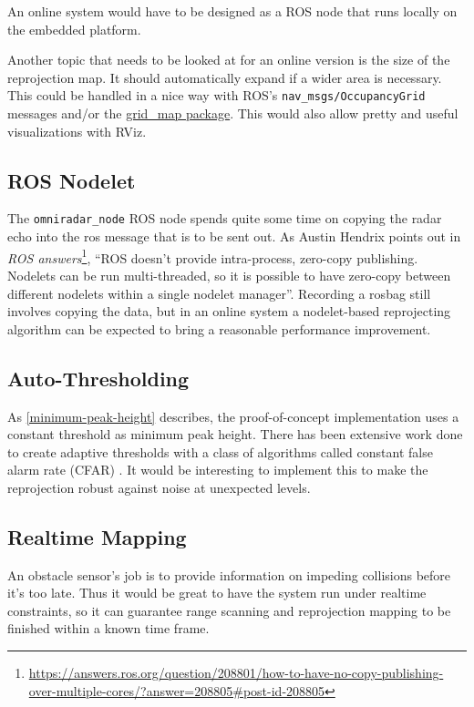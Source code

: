 An online system would have to be designed as a ROS node that
runs locally on the embedded platform.

Another topic that needs to be looked at for an online version is the
size of the reprojection map. It should automatically expand if a wider
area is necessary. This could be handled in a nice way with ROS's
\texttt{nav\_msgs/OccupancyGrid} messages and/or the
\href{http://wiki.ros.org/grid_map}{grid\_map package}. This would also
allow pretty and useful visualizations with RViz.


\subsection{ROS Nodelet}\label{ros-nodelet}
The \texttt{omniradar\_node} ROS node spends quite some time on copying
the radar echo into the ros message that is to be sent out. As Austin
Hendrix points out in \textit{ROS answers}\footnote{\url{https://answers.ros.org/question/208801/how-to-have-no-copy-publishing-over-multiple-cores/?answer=208805\#post-id-208805}}, ``ROS doesn't provide intra-process, zero-copy publishing.
Nodelets can be run multi-threaded, so it is possible to have zero-copy
between different nodelets within a single nodelet manager''. Recording
a rosbag still involves copying the data, but in an online system a
nodelet-based reprojecting algorithm can be expected to bring a
reasonable performance improvement.


\subsection{Auto-Thresholding}\label{auto-thresholding}
As \cref{minimum-peak-height} describes, the proof-of-concept implementation uses a constant threshold as minimum peak height. There has been extensive work done to create adaptive thresholds with a class of algorithms called constant false alarm rate (CFAR) \cite{Skolnik2008,Adams2012}. It would be interesting to implement this to make the reprojection robust against noise at unexpected levels.


\subsection{Realtime Mapping}\label{realtime}
An obstacle sensor's job is to provide information on impeding
collisions before it's too late. Thus it would be great to have the
system run under realtime constraints, so it can guarantee range
scanning and reprojection mapping to be finished within a known time
frame.


